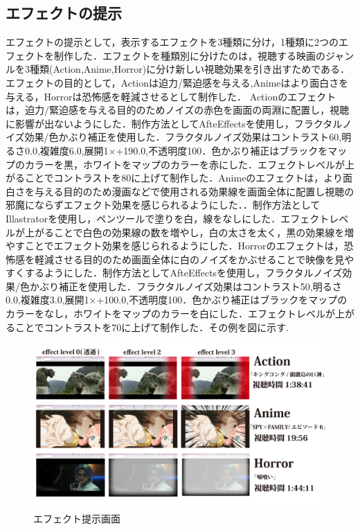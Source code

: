 \subsection{エフェクトの提示}
エフェクトの提示として，表示するエフェクトを3種類に分け，1種類に2つのエフェクトを制作した．エフェクトを種類別に分けたのは，視聴する映画のジャンルを3種類(Action,Anime,Horror)に分け新しい視聴効果を引き出すためである．
エフェクトの目的として，Actionは迫力/緊迫感を与える,Animeはより面白さを与える，Horrorは恐怖感を軽減させるとして制作した．
Actionのエフェクトは，迫力/緊迫感を与える目的のためノイズの赤色を画面の両淵に配置し，視聴に影響が出ないようにした．制作方法としてAfteEffectsを使用し，フラクタルノイズ効果/色かぶり補正を使用した．フラクタルノイズ効果はコントラスト60,明るさ0.0,複雑度6.0,展開1×+190.0,不透明度100．色かぶり補正はブラックをマップのカラーを黒，ホワイトをマップのカラーを赤にした．エフェクトレベルが上がることでコントラストを80に上げて制作した．Animeのエフェクトは，より面白さを与える目的のため漫画などで使用される効果線を画面全体に配置し視聴の邪魔にならずエフェクト効果を感じられるようにした．．制作方法としてIllastratorを使用し，ペンツールで塗りを白，線をなしにした．エフェクトレベルが上がることで白色の効果線の数を増やし，白の太さを太く，黒の効果線を増やすことでエフェクト効果を感じられるようにした．Horrorのエフェクトは，恐怖感を軽減させる目的のため画面全体に白のノイズをかぶせることで映像を見やすくするようにした．制作方法としてAfteEffectsを使用し，フラクタルノイズ効果/色かぶり補正を使用した．フラクタルノイズ効果はコントラスト50,明るさ0.0,複雑度3.0,展開1×+100.0,不透明度100．色かぶり補正はブラックをマップのカラーをなし，ホワイトをマップのカラーを白にした．エフェクトレベルが上がることでコントラストを70に上げて制作した．その例を図に示す.

\begin{figure}[H]
    \centering
    \includegraphics[width=15cm]{images/chapter3/efects.jpg}
    \caption{エフェクト提示画面}
\end{figure}